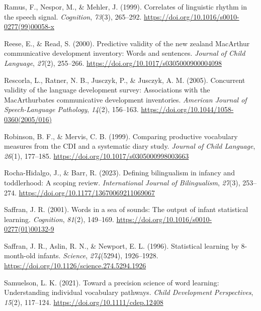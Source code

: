 \documentclass[
  12pt,
  b5paperpaper,
  twoside]{scrreprt}
\newlength{\cslhangindent}
\newlength{\cslentryspacingunit} %
\newenvironment{CSLReferences}[2] %
 {%
  \setlength{\parindent}{0pt}
  \ifodd #1
  \let\oldpar\par
  \def\par{\hangindent=\cslhangindent\oldpar}
  \fi
  \setlength{\parskip}{#2\cslentryspacingunit}
 }%
 {}
\begin{document}
\begin{CSLReferences}{1}{0}
\leavevmode{}%
Ramus, F., Nespor, M., \& Mehler, J. (1999). Correlates of linguistic
rhythm in the speech signal. \emph{Cognition}, \emph{73}(3), 265--292.
\url{https://doi.org/10.1016/s0010-0277(99)00058-x}

\leavevmode{}%
Reese, E., \& Read, S. (2000). Predictive validity of the new zealand
{MacArthur} communicative development inventory: Words and sentences.
\emph{Journal of Child Language}, \emph{27}(2), 255--266.
\url{https://doi.org/10.1017/s0305000900004098}

\leavevmode{}%
Rescorla, L., Ratner, N. B., Jusczyk, P., \& Jusczyk, A. M. (2005).
Concurrent validity of the language development survey: Associations
with the {MacArthur}{\textemdash}bates communicative development
inventories. \emph{American Journal of Speech-Language Pathology},
\emph{14}(2), 156--163.
\url{https://doi.org/10.1044/1058-0360(2005/016)}

\leavevmode{}%
Robinson, B. F., \& Mervis, C. B. (1999). Comparing productive
vocabulary measures from the {CDI} and a systematic diary study.
\emph{Journal of Child Language}, \emph{26}(1), 177--185.
\url{https://doi.org/10.1017/s0305000998003663}

\leavevmode{}%
Rocha-Hidalgo, J., \& Barr, R. (2023). Defining bilingualism in infancy
and toddlerhood: A scoping review. \emph{International Journal of
Bilingualism}, \emph{27}(3), 253--274.
\url{https://doi.org/10.1177/13670069211069067}

\leavevmode{}%
Saffran, J. R. (2001). Words in a sea of sounds: The output of infant
statistical learning. \emph{Cognition}, \emph{81}(2), 149--169.
\url{https://doi.org/10.1016/s0010-0277(01)00132-9}

\leavevmode{}%
Saffran, J. R., Aslin, R. N., \& Newport, E. L. (1996). Statistical
learning by 8-month-old infants. \emph{Science}, \emph{274}(5294),
1926--1928. \url{https://doi.org/10.1126/science.274.5294.1926}

\leavevmode{}%
Samuelson, L. K. (2021). Toward a precision science of word learning:
Understanding individual vocabulary pathways. \emph{Child Development
Perspectives}, \emph{15}(2), 117--124.
\url{https://doi.org/10.1111/cdep.12408}


\end{CSLReferences}
\end{document}
